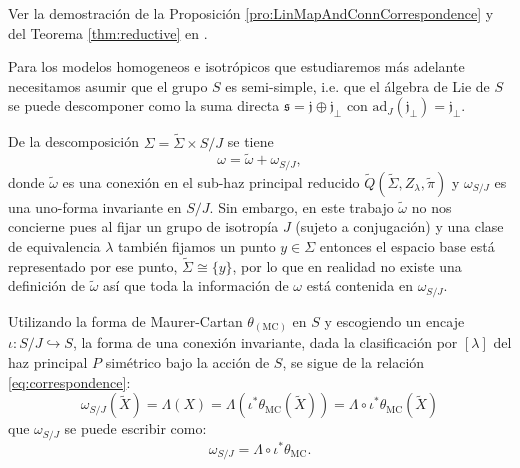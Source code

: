 Ver la demostraci\'{o}n de la Proposici\'{o}n \autoref{pro:LinMapAndConnCorrespondence} y del Teorema \autoref{thm:reductive} en \cite{Kobayashi}.

Para los modelos homogeneos e isotr\'{o}picos que estudiaremos m\'{a}s adelante necesitamos asumir que el grupo $S$ es semi-simple, i.e. que el \'{a}lgebra de Lie de $S$ se puede descomponer como la suma directa $\mathfrak{s} = \mathfrak{j} \oplus \mathfrak{j}_{\perp}$ con $\mathrm{ad}_{J}(\mathfrak{j_{\perp}}) = \mathfrak{j_{\perp}}$.

De la descomposici\'{o}n $\Sigma = \tilde{\Sigma} \times S/J$ se tiene
%
\begin{equation}
\omega = \tilde{\omega} + \omega_{S/J},
\end{equation}
%
donde $\tilde{\omega}$ es una conexi\'{o}n en el sub-haz principal reducido $\tilde{Q}(\tilde{\Sigma}, Z_{\lambda}, \tilde{\pi})$ y $\omega_{S/J}$ es una uno-forma invariante en $S/J$. Sin embargo, en este trabajo $\tilde{\omega}$ no nos concierne pues al fijar un grupo de isotrop\'{i}a $J$ (sujeto a conjugaci\'{o}n) y una clase de equivalencia $\lambda$ tambi\'{e}n fijamos un punto $y \in \Sigma$ entonces el espacio base est\'{a} representado por ese punto, $\tilde{\Sigma} \cong \{y\}$, por lo que en realidad no existe una definici\'{o}n de $\tilde{\omega}$ as\'{i} que toda la informaci\'{o}n de $\omega$ est\'{a} contenida en $\omega_{S/J}$.

Utilizando la forma de Maurer-Cartan $\theta_{(\mathrm{MC})}$ en $S$ y escogiendo un encaje $\iota: S/J \hookrightarrow S$, la forma de una conexi\'{o}n invariante, dada la clasificaci\'{o}n por $[\lambda]$ del haz principal $P$ sim\'{e}trico bajo la acci\'{o}n de $S$, se sigue de la relaci\'{o}n \eqref{eq:correspondence}:
%
\begin{equation*}
\omega_{S/J} (\tilde{X}) = \Lambda (X) = \Lambda (\iota^{*} \theta_{\mathrm{MC}} (\tilde{X})) = \Lambda \circ \iota^{*} \theta_{\mathrm{MC}} (\tilde{X})
\end{equation*}
%
que $\omega_{S/J}$ se puede escribir como:
%
\begin{equation}
\omega_{S/J} = \Lambda \circ \iota^{*} \theta_{\mathrm{MC}}.
\end{equation}